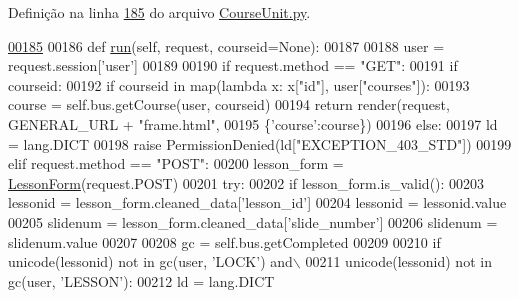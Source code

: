 Definição na linha \hyperlink{CourseUnit_8py_source_l00185}{185} do arquivo \hyperlink{CourseUnit_8py_source}{Course\-Unit.\-py}.


\begin{DoxyCode}
\hypertarget{classCourse_1_1CourseUnit_1_1UiCourse_l00185}{}\hyperlink{classCourse_1_1CourseUnit_1_1UiCourse_aaaf2b8229f2b774f12e719bc0e6f13cb}{00185} 
00186     \textcolor{keyword}{def }\hyperlink{classCourse_1_1CourseUnit_1_1UiCourse_aaaf2b8229f2b774f12e719bc0e6f13cb}{run}(self, request, courseid=None):
00187         
00188         user = request.session[\textcolor{stringliteral}{'user'}]
00189 
00190         \textcolor{keywordflow}{if} request.method == \textcolor{stringliteral}{"GET"}:
00191             \textcolor{keywordflow}{if} courseid:
00192                 \textcolor{keywordflow}{if} courseid \textcolor{keywordflow}{in} map(\textcolor{keyword}{lambda} x: x[\textcolor{stringliteral}{"id"}], user[\textcolor{stringliteral}{"courses"}]):
00193                     course = self.bus.getCourse(user, courseid)
00194                     \textcolor{keywordflow}{return} render(request, GENERAL\_URL + \textcolor{stringliteral}{"frame.html"}, 
00195                         \{\textcolor{stringliteral}{'course'}:course\})
00196                 \textcolor{keywordflow}{else}:
00197                     ld = lang.DICT
00198                     \textcolor{keywordflow}{raise} PermissionDenied(ld[\textcolor{stringliteral}{"EXCEPTION\_403\_STD"}])
00199         \textcolor{keywordflow}{elif} request.method == \textcolor{stringliteral}{"POST"}:
00200             lesson\_form = \hyperlink{classCourse_1_1forms_1_1LessonForm}{LessonForm}(request.POST)
00201             \textcolor{keywordflow}{try}:
00202                 \textcolor{keywordflow}{if} lesson\_form.is\_valid():
00203                     lessonid = lesson\_form.cleaned\_data[\textcolor{stringliteral}{'lesson\_id'}]
00204                     lessonid = lessonid.value
00205                     slidenum = lesson\_form.cleaned\_data[\textcolor{stringliteral}{'slide\_number'}]
00206                     slidenum = slidenum.value
00207 
00208                     gc = self.bus.getCompleted
00209 
00210                     \textcolor{keywordflow}{if} unicode(lessonid) \textcolor{keywordflow}{not} \textcolor{keywordflow}{in} gc(user, \textcolor{stringliteral}{'LOCK'}) \textcolor{keywordflow}{and}\(\backslash\)
00211                        unicode(lessonid) \textcolor{keywordflow}{not} \textcolor{keywordflow}{in} gc(user, \textcolor{stringliteral}{'LESSON'}):
00212                             ld = lang.DICT

\end{DoxyCode}
